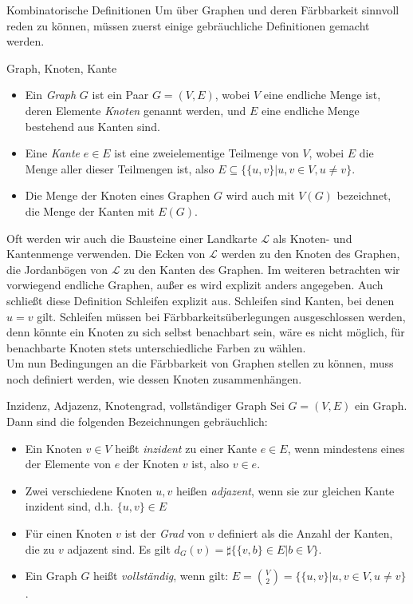 \begin{section}{Kombinatorische Definitionen}
  Um über Graphen und deren Färbbarkeit sinnvoll reden zu können, müssen zuerst einige gebräuchliche Definitionen gemacht werden. 
 
  \begin{definition}{Graph, Knoten, Kante}
    \-\ 
    \begin{itemize}
    \item Ein \textit{Graph} $G$ ist ein Paar $G=(V,E)$, wobei $V$ eine endliche Menge ist, deren Elemente \textit{Knoten} genannt werden, und $E$ eine endliche Menge bestehend aus Kanten sind.
    \item Eine \textit{Kante} $e \in E$ ist eine zweielementige Teilmenge von $V$, wobei $E$ die Menge aller dieser Teilmengen ist, also $E \subseteq \{\{u,v\}|u,v \in V, u \neq v\}$.
    \item Die Menge der Knoten eines Graphen $G$ wird auch mit $V(G)$ bezeichnet, die Menge der Kanten mit $E(G)$.
    \end{itemize}
  \end{definition}
  
  Oft werden wir auch die Bausteine einer Landkarte $\mathcal{L}$ als Knoten- und Kantenmenge verwenden. Die Ecken von $\mathcal{L}$ werden zu den Knoten des Graphen, die Jordanbögen von $\mathcal{L}$ zu den Kanten des Graphen. Im weiteren betrachten wir vorwiegend endliche Graphen, außer es wird explizit anders angegeben. Auch schließt diese Definition Schleifen explizit aus. Schleifen sind Kanten, bei denen $u=v$ gilt. Schleifen müssen bei Färbbarkeitsüberlegungen ausgeschlossen werden, denn könnte ein Knoten zu sich selbst benachbart sein, wäre es nicht möglich, für benachbarte Knoten stets unterschiedliche Farben zu wählen.\\
  Um nun Bedingungen an die Färbbarkeit von Graphen stellen zu können, muss noch definiert werden, wie dessen Knoten zusammenhängen.
 
  \begin{definition}{Inzidenz, Adjazenz, Knotengrad, vollständiger Graph}
    Sei $G=(V,E)$ ein Graph. Dann sind die folgenden Bezeichnungen gebräuchlich:
    \begin{itemize}
    \item Ein Knoten $v \in V$ heißt \textit{inzident} zu einer Kante $e \in E$, wenn mindestens eines der Elemente von $e$ der Knoten $v$ ist, also $v \in e$. 
    \item Zwei verschiedene Knoten $u,v$ heißen \textit{adjazent}, wenn sie zur gleichen Kante inzident sind, d.h. $\{u,v\}\in E$
    \item Für einen Knoten $v$ ist der \textit{Grad} von $v$ definiert als die Anzahl der Kanten, die zu $v$ adjazent sind. Es gilt $d_G(v) = \sharp\{\{v,b\} \in E | b\in V\}$.
    \item Ein Graph $G$ heißt \textit{vollständig}, wenn gilt: $E = \binom{V}{2} = \{\{u,v\}|u,v \in V, u \neq v\}$.
   \end{itemize}
  \end{definition}
    

\end{section}
